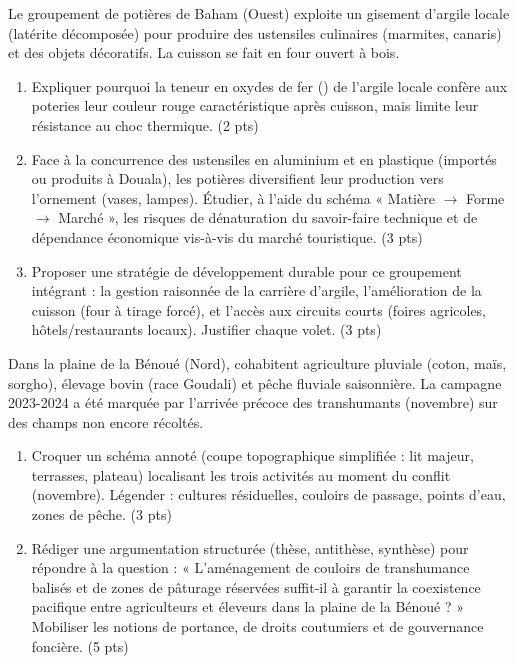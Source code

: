 \documentclass[11pt]{article}
\begin{document}
\begin{exercice}
Le groupement de potières de Baham (Ouest) exploite un gisement d'argile locale (latérite décomposée) pour produire des ustensiles culinaires (marmites, canaris) et des objets décoratifs. La cuisson se fait en four ouvert à bois.

\begin{enumerate}
\item Expliquer pourquoi la teneur en oxydes de fer () de l'argile locale confère aux poteries leur couleur rouge caractéristique après cuisson, mais limite leur résistance au choc thermique. \hfill (2 pts)
\item Face à la concurrence des ustensiles en aluminium et en plastique (importés ou produits à Douala), les potières diversifient leur production vers l'ornement (vases, lampes). Étudier, à l'aide du schéma « Matière $\rightarrow$ Forme $\rightarrow$ Marché », les risques de dénaturation du savoir-faire technique et de dépendance économique vis-à-vis du marché touristique. \hfill (3 pts)
\item Proposer une stratégie de développement durable pour ce groupement intégrant : la gestion raisonnée de la carrière d'argile, l'amélioration de la cuisson (four à tirage forcé), et l'accès aux circuits courts (foires agricoles, hôtels/restaurants locaux). Justifier chaque volet. \hfill (3 pts)
\end{enumerate}
\end{exercice}

\begin{exercice}
Dans la plaine de la Bénoué (Nord), cohabitent agriculture pluviale (coton, maïs, sorgho), élevage bovin (race Goudali) et pêche fluviale saisonnière. La campagne 2023-2024 a été marquée par l'arrivée précoce des transhumants (novembre) sur des champs non encore récoltés.

\begin{enumerate}
\item Croquer un schéma annoté (coupe topographique simplifiée : lit majeur, terrasses, plateau) localisant les trois activités au moment du conflit (novembre). Légender : cultures résiduelles, couloirs de passage, points d'eau, zones de pêche. \hfill (3 pts)
\item Rédiger une argumentation structurée (thèse, antithèse, synthèse) pour répondre à la question : « L'aménagement de couloirs de transhumance balisés et de zones de pâturage réservées suffit-il à garantir la coexistence pacifique entre agriculteurs et éleveurs dans la plaine de la Bénoué ? » Mobiliser les notions de portance, de droits coutumiers et de gouvernance foncière. \hfill (5 pts)
\end{enumerate}
\end{exercice}
\end{document}
